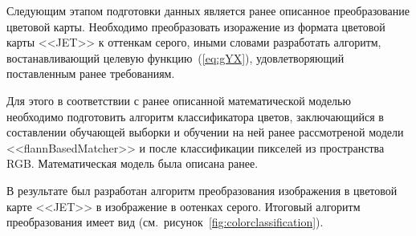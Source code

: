 \documentclass[14pt, a4paper]{extreport}
\begin{document}
	Следующим этапом подготовки данных является ранее описанное преобразование цветовой карты. Необходимо преобразовать изоражение из формата цветовой карты <<JET>> к оттенкам серого, иными словами разработать алгоритм, востанавливающий целевую функцию~(\ref{eq:gYX}), удовлетворяющий поставленным ранее требованиям.
	
	Для этого в соответствии с ранее описанной математической моделью необходимо подготовить алгоритм классификатора цветов, заключающийся в составлении обучающей выборки и обучении на ней ранее рассмотреной модели <<flannBasedMatcher>> и после классификации пикселей из пространства RGB. Математическая модель была описана ранее.  
	
	В результате был разработан алгоритм преобразования изображения в цветовой карте <<JET>> в изображение в оотенках серого. Итоговый алгоритм преобразования имеет вид (см.~рисунок~\ref{fig:colorclassification}).
	
\end{document}
